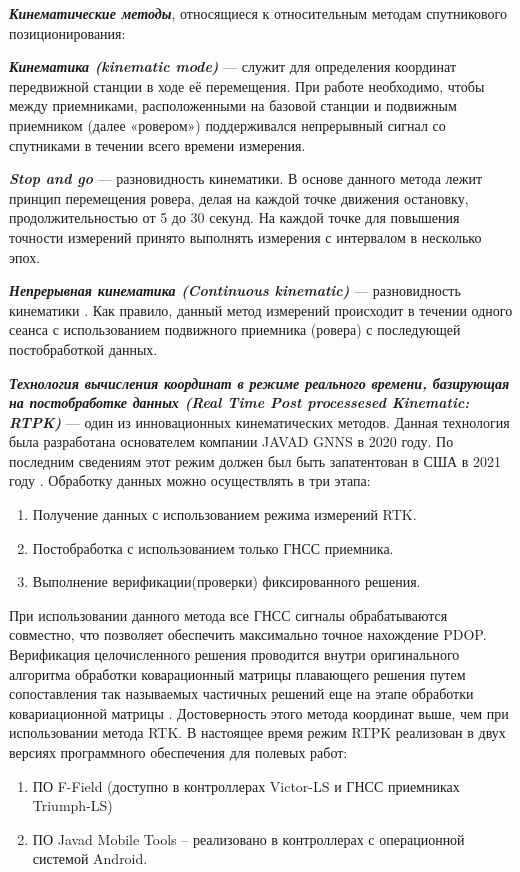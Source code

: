 \textbf{\textit{Кинематические методы}}, относящиеся к относительным методам спутникового позиционирования:

\textbf{\textit{Кинематика (kinematic mode)}} --- служит для определения координат передвижной станции в ходе её перемещения. При работе необходимо, чтобы между приемниками, расположенными на базовой станции и подвижным приемником (далее «ровером») поддерживался непрерывный сигнал со спутниками в течении всего времени измерения.

\textbf{\textit{Stop and go}} --- разновидность кинематики. В основе данного метода лежит принцип перемещения ровера, делая на каждой точке движения остановку, продолжительностью от 5 до 30 секунд. На каждой точке для повышения точности измерений принято выполнять измерения с интервалом в несколько эпох.

\textbf{\textit{Непрерывная кинематика (Continuous kinematic)}} --- разновидность кинематики \cite{src02}. Как правило, данный метод измерений происходит в течении одного сеанса с использованием подвижного приемника (ровера) с последующей постобработкой данных.

\textbf{\textit{Технология вычисления координат в режиме реального времени, базирующая на постобработке данных (Real Time Post processesed Kinematic: RTPK)}} --- один из инновационных кинематических методов. Данная технология была разработана основателем компании JAVAD GNNS в 2020 году. По последним сведениям этот режим должен был быть запатентован в США в 2021 году \cite{src73}. Обработку данных можно осуществлять в три этапа: 
\begin{enumerate}
	\item Получение данных с использованием режима измерений RTK.
	\item Постобработка с использованием только ГНСС приемника.
	\item Выполнение верификации(проверки) фиксированного решения.
\end{enumerate}


При использовании данного метода все ГНСС сигналы обрабатываются совместно, что позволяет обеспечить максимально точное нахождение PDOP. Верификация целочисленного решения проводится внутри оригинального алгоритма обработки коварационный матрицы плавающего решения путем сопоставления так называемых частичных решений еще на этапе обработки ковариационной матрицы \cite{src40,src49}. Достоверность этого метода координат выше, чем при использовании метода RTK. В настоящее время режим RTPK реализован в двух версиях программного обеспечения для полевых работ:
\begin{enumerate}
	\item ПО F-Field (доступно в контроллерах Victor-LS и ГНСС приемниках Triumph-LS) 
	\item ПО Javad Mobile Tools – реализовано в контроллерах с операционной системой Android. 
\end{enumerate}

